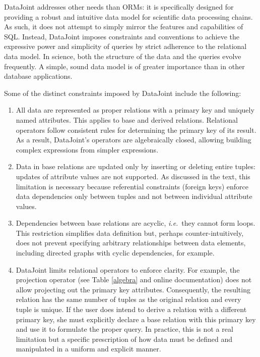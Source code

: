 DataJoint addresses other needs than ORMs: it is specifically designed for providing a robust and intuitive data model for scientific data processing chains.
As such, it does not attempt to simply mirror the features and capabilities of SQL.
Instead, DataJoint imposes constraints and conventions to achieve the expressive power and simplicity of queries by strict adherence to the relational data model.
In science, both the structure of the data and the queries evolve frequently. 
A simple, sound data model is of greater importance than in other database applications.

Some of the distinct constraints imposed by DataJoint include the following:
\begin{enumerate}

\item
All data are represented as proper relations with a primary key and uniquely named attributes. 
This applies to base and derived relations. 
Relational operators follow consistent rules for determining the primary key of its result. 
As a result, DataJoint's operators are algebraically closed, allowing building complex expressions from simpler expressions.

\item
Data in base relations are updated only by inserting or deleting entire tuples: updates of attribute values are not supported.
As discussed in the text, this limitation is necessary because referential constraints (foreign keys) enforce data dependencies only between tuples and not between individual attribute values. 

\item 
Dependencies between base relations are acyclic, \emph{i.e.}\ they cannot form loops. 
This restriction simplifies data definition but, perhaps counter-intuitively, does not prevent specifying arbitrary relationships between data elements, including directed graphs with cyclic dependencies, for example.

\item
DataJoint limits relational operators to enforce clarity.
For example, the projection operator (see Table \ref{algebra} and online documentation) does not allow projecting out the primary key attributes.
Consequently, the resulting relation has the same number of tuples as the original relation and every tuple is unique.
If the user does intend to derive a relation with a different primary key, she must explicitly declare a base relation with this primary key and use it to formulate the proper query.
In practice, this is not a real limitation but a specific prescription of how data must be defined and manipulated in a uniform and explicit manner.


\end{enumerate}
